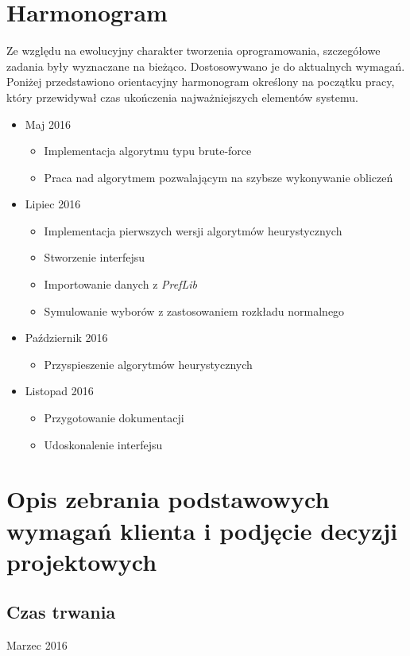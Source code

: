 \documentclass[pdflatex,11pt]{../aghdoc_version2}
\begin{document}
\section{Harmonogram}
Ze względu na ewolucyjny charakter tworzenia oprogramowania, szczegółowe zadania były wyznaczane na bieżąco. Dostosowywano je do aktualnych wymagań. Poniżej przedstawiono orientacyjny harmonogram określony na początku pracy, który
przewidywał czas ukończenia najważniejszych elementów systemu.
\begin{itemize}
\item Maj 2016
	\begin{itemize}
	\item Implementacja algorytmu typu brute-force
	\item Praca nad algorytmem pozwalającym na szybsze wykonywanie obliczeń
	\end{itemize}
\item Lipiec 2016
	\begin{itemize}
	\item Implementacja pierwszych wersji algorytmów heurystycznych
	\item Stworzenie interfejsu
	\item Importowanie danych z \textit{PrefLib}
	\item Symulowanie wyborów z zastosowaniem rozkładu normalnego
	\end{itemize}
\item Październik 2016
	\begin{itemize}
	\item Przyspieszenie algorytmów heurystycznych
	\end{itemize}
\item Listopad 2016
	\begin{itemize}
	\item Przygotowanie dokumentacji
	\item Udoskonalenie interfejsu
	\end{itemize}
\end{itemize}

\newpage
\section{Opis zebrania podstawowych wymagań klienta i podjęcie
decyzji projektowych}

\subsection{Czas trwania}
Marzec 2016
\end{document}
